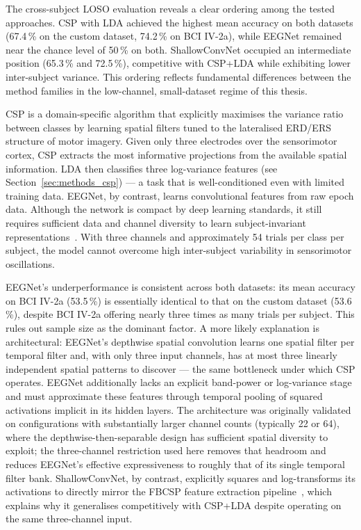 \documentclass[english, bc, kiv, he, iso690alph, pdf]{fasthesis}
\begin{document}
The cross-subject LOSO evaluation reveals a clear ordering among the tested approaches. CSP with LDA achieved the highest mean accuracy on both datasets (67.4\,\% on the custom dataset, 74.2\,\% on BCI IV-2a), while EEGNet remained near the chance level of 50\,\% on both. ShallowConvNet occupied an intermediate position (65.3\,\% and 72.5\,\%), competitive with CSP+LDA while exhibiting lower inter-subject variance. This ordering reflects fundamental differences between the method families in the low-channel, small-dataset regime of this thesis.

CSP is a domain-specific algorithm that explicitly maximises the variance ratio between classes by learning spatial filters tuned to the lateralised ERD/ERS structure of motor imagery. Given only three electrodes over the sensorimotor cortex, CSP extracts the most informative projections from the available spatial information. LDA then classifies three log-variance features (see Section~\ref{sec:methods_csp}) — a task that is well-conditioned even with limited training data. EEGNet, by contrast, learns convolutional features from raw epoch data. Although the network is compact by deep learning standards, it still requires sufficient data and channel diversity to learn subject-invariant representations~\cite{lawhern2018eegnet}. With three channels and approximately 54 trials per class per subject, the model cannot overcome high inter-subject variability in sensorimotor oscillations.

EEGNet's underperformance is consistent across both datasets: its mean accuracy on BCI IV-2a (53.5\,\%) is essentially identical to that on the custom dataset (53.6\,\%), despite BCI IV-2a offering nearly three times as many trials per subject. This rules out sample size as the dominant factor. A more likely explanation is architectural: EEGNet's depthwise spatial convolution learns one spatial filter per temporal filter and, with only three input channels, has at most three linearly independent spatial patterns to discover --- the same bottleneck under which CSP operates. EEGNet additionally lacks an explicit band-power or log-variance stage and must approximate these features through temporal pooling of squared activations implicit in its hidden layers. The architecture was originally validated on configurations with substantially larger channel counts (typically 22 or 64), where the depthwise-then-separable design has sufficient spatial diversity to exploit; the three-channel restriction used here removes that headroom and reduces EEGNet's effective expressiveness to roughly that of its single temporal filter bank. ShallowConvNet, by contrast, explicitly squares and log-transforms its activations to directly mirror the FBCSP feature extraction pipeline~\cite{schirrmeister2017deep}, which explains why it generalises competitively with CSP+LDA despite operating on the same three-channel input.
\end{document}
